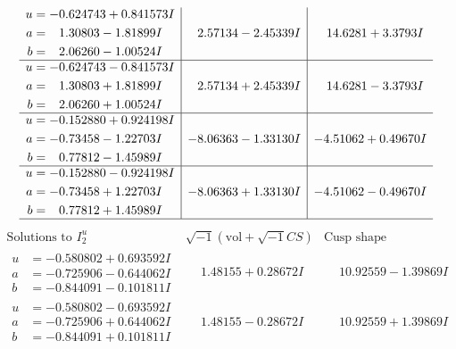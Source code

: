 \documentclass[1p]{elsarticle_modified}
\theoremstyle{definition}
\newcommand{\I}{\sqrt{-1}}
\begin{document}
$$\begin{array}{c|c|c}
\begin{aligned}
u &= -0.624743 + 0.841573 I \\
a &= \phantom{-}1.30803 - 1.81899 I \\
b &= \phantom{-}2.06260 - 1.00524 I\end{aligned}
 & \phantom{-}2.57134 - 2.45339 I & \phantom{-}14.6281 + 3.3793 I \\ \hline\begin{aligned}
u &= -0.624743 - 0.841573 I \\
a &= \phantom{-}1.30803 + 1.81899 I \\
b &= \phantom{-}2.06260 + 1.00524 I\end{aligned}
 & \phantom{-}2.57134 + 2.45339 I & \phantom{-}14.6281 - 3.3793 I \\ \hline\begin{aligned}
u &= -0.152880 + 0.924198 I \\
a &= -0.73458 - 1.22703 I \\
b &= \phantom{-}0.77812 - 1.45989 I\end{aligned}
 & -8.06363 - 1.33130 I & -4.51062 + 0.49670 I \\ \hline\begin{aligned}
u &= -0.152880 - 0.924198 I \\
a &= -0.73458 + 1.22703 I \\
b &= \phantom{-}0.77812 + 1.45989 I\end{aligned}
 & -8.06363 + 1.33130 I & -4.51062 - 0.49670 I\\
 \hline 
 \end{array}$$\newpage$$\begin{array}{c|c|c}  
\text{Solutions to }I^u_{2}& \I (\text{vol} + \sqrt{-1}CS) & \text{Cusp shape}\\
 \hline 
\begin{aligned}
u &= -0.580802 + 0.693592 I \\
a &= -0.725906 - 0.644062 I \\
b &= -0.844091 - 0.101811 I\end{aligned}
 & \phantom{-}1.48155 + 0.28672 I & \phantom{-}10.92559 - 1.39869 I \\ \hline\begin{aligned}
u &= -0.580802 - 0.693592 I \\
a &= -0.725906 + 0.644062 I \\
b &= -0.844091 + 0.101811 I\end{aligned}
 & \phantom{-}1.48155 - 0.28672 I & \phantom{-}10.92559 + 1.39869 I \\ \hline\begin{aligned}

\end{aligned}
\end{array}$$
\end{document}
